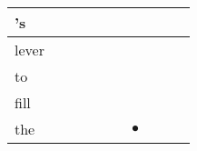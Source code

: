 \documentclass[landscape]{article}
\newcommand{\ssp}{\hspace{2pt}}
\newcommand{\mex}{\cellcolor{g}$\bullet$}
\begin{document}
\begin{tabular}{|l|p{10pt}|p{10pt}|p{10pt}|p{10pt}|p{10pt}|p{10pt}|p{10pt}|p{10pt}|p{10pt}|}
\hline
\ssp 's \ssp&\hspace{2pt}&\hspace{2pt}&\hspace{2pt}&\hspace{2pt}&\hspace{2pt}&\hspace{2pt}&\hspace{2pt}&\hspace{2pt}&\hspace{2pt}\\
\hline
\ssp lever \ssp&\hspace{2pt}&\hspace{2pt}&\hspace{2pt}&\hspace{2pt}&\hspace{2pt}&\hspace{2pt}&\hspace{2pt}&\hspace{2pt}&\hspace{2pt}\\
\hline
\ssp to \ssp&\hspace{2pt}&\hspace{2pt}&\hspace{2pt}&\hspace{2pt}&\hspace{2pt}&\hspace{2pt}&\hspace{2pt}&\hspace{2pt}&\hspace{2pt}\\
\hline
\ssp fill \ssp&\hspace{2pt}&\hspace{2pt}&\hspace{2pt}&\hspace{2pt}&\hspace{2pt}&\hspace{2pt}&\hspace{2pt}&\hspace{2pt}&\hspace{2pt}\\
\hline
\ssp \cellcolor{ref5}the \ssp&\hspace{2pt}&\hspace{2pt}&\hspace{2pt}&\hspace{2pt}&\hspace{2pt}&\hspace{2pt}\mex&\hspace{2pt}&\hspace{2pt}&\hspace{2pt}\\

\end{tabular}
\end{document}
